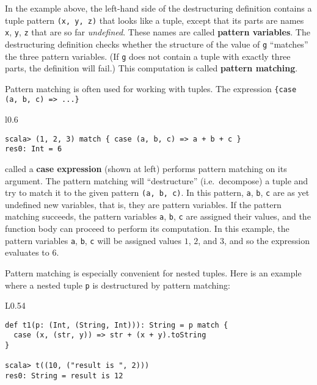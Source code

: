 In the example above, the left-hand side of the destructuring definition
contains a tuple pattern \lstinline!(x, y, z)! that looks like a
tuple, except that its parts are names \lstinline!x!, \lstinline!y!,
\lstinline!z! that are so far \emph{undefined}. These names are called
\textbf{pattern variables}. The destructuring
definition checks whether the structure of the value of \lstinline!g!
``matches'' the three pattern variables.
(If \lstinline!g! does not contain a tuple with exactly three parts,
the definition will fail.) This computation is called \textbf{pattern
matching}.

Pattern matching is often used for working with tuples. The expression
\lstinline!{case (a, b, c) => ...}!\begin{wrapfigure}{l}{0.6\columnwidth}%
\vspace{-0.7\baselineskip}
\begin{lstlisting}
scala> (1, 2, 3) match { case (a, b, c) => a + b + c }
res0: Int = 6
\end{lstlisting}
\vspace{-1.5\baselineskip}
\end{wrapfigure}%
called a \textbf{case expression}
(shown at left) performs pattern matching on its argument. The pattern
matching will ``destructure'' (i.e.~decompose) a tuple and try
to match it to the given pattern \lstinline!(a, b, c)!. In this pattern,
\lstinline!a!, \lstinline!b!, \lstinline!c! are as yet undefined
new variables, \textemdash{} that is, they are pattern
variables. If the pattern matching succeeds, the pattern variables
\lstinline!a!, \lstinline!b!, \lstinline!c! are assigned their
values, and the function body can proceed to perform its computation.
In this example, the pattern variables \lstinline!a!, \lstinline!b!,
\lstinline!c! will be assigned values $1$, $2$, and $3$, and so
the expression evaluates to $6$.

Pattern matching is especially convenient for nested tuples. Here
is an example where a nested tuple \lstinline!p! is destructured
by pattern matching:\hfill{}~\begin{wrapfigure}{L}{0.54\columnwidth}%
\vspace{-0.8\baselineskip}
\begin{lstlisting}
def t1(p: (Int, (String, Int))): String = p match {
  case (x, (str, y)) => str + (x + y).toString
}

scala> t((10, ("result is ", 2)))
res0: String = result is 12
\end{lstlisting}
\vspace{-1.5\baselineskip}
\end{wrapfigure}%
\textbf{ }

